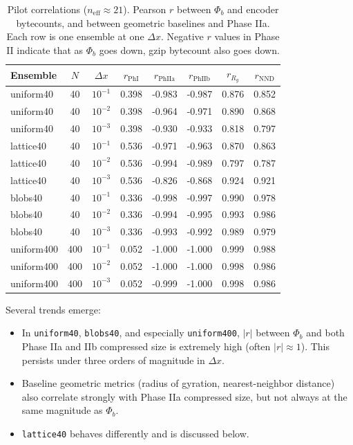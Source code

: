 \documentclass[11pt,a4paper]{article}
\newcommand{\phib}{\Phi_b}
\begin{document}
\begin{table}[htbp]
\centering
\caption{Pilot correlations ($n_{\text{eff}}\approx 21$). Pearson $r$ between $\phib$ and encoder bytecounts, and between geometric baselines and Phase IIa. Each row is one ensemble at one $\Delta x$. Negative $r$ values in Phase II indicate that as $\phib$ goes down, gzip bytecount also goes down.}
\label{tab:corr-table}
\small
\begin{tabular}{lccccccc}
\toprule
Ensemble & $N$ & $\Delta x$ & $r_{\text{PhI}}$ & $r_{\text{PhIIa}}$ & $r_{\text{PhIIb}}$ & $r_{R_g}$ & $r_{\text{NND}}$ \\
\midrule
uniform40    & 40  & $10^{-1}$ & 0.398 & -0.983 & -0.987 & 0.876 & 0.852 \\
uniform40    & 40  & $10^{-2}$ & 0.398 & -0.964 & -0.971 & 0.890 & 0.868 \\
uniform40    & 40  & $10^{-3}$ & 0.398 & -0.930 & -0.933 & 0.818 & 0.797 \\
lattice40    & 40  & $10^{-1}$ & 0.536 & -0.971 & -0.963 & 0.870 & 0.863 \\
lattice40    & 40  & $10^{-2}$ & 0.536 & -0.994 & -0.989 & 0.797 & 0.787 \\
lattice40    & 40  & $10^{-3}$ & 0.536 & -0.826 & -0.868 & 0.924 & 0.921 \\
blobs40      & 40  & $10^{-1}$ & 0.336 & -0.998 & -0.997 & 0.990 & 0.978 \\
blobs40      & 40  & $10^{-2}$ & 0.336 & -0.994 & -0.995 & 0.993 & 0.986 \\
blobs40      & 40  & $10^{-3}$ & 0.336 & -0.993 & -0.992 & 0.989 & 0.979 \\
uniform400   & 400 & $10^{-1}$ & 0.052 & -1.000 & -1.000 & 0.999 & 0.988 \\
uniform400   & 400 & $10^{-2}$ & 0.052 & -1.000 & -1.000 & 0.998 & 0.986 \\
uniform400   & 400 & $10^{-3}$ & 0.052 & -0.999 & -1.000 & 0.998 & 0.986 \\
\bottomrule
\end{tabular}
\end{table}

Several trends emerge:

\begin{itemize}
\item In \texttt{uniform40}, \texttt{blobs40}, and especially \texttt{uniform400}, $|r|$ between $\phib$ and both Phase IIa and IIb compressed size is extremely high (often $|r|\approx 1$). This persists under three orders of magnitude in $\Delta x$.
\item Baseline geometric metrics (radius of gyration, nearest-neighbor distance) also correlate strongly with Phase IIa compressed size, but not always at the same magnitude as $\phib$.
\item \texttt{lattice40} behaves differently and is discussed below.
\end{itemize}
\end{document}
